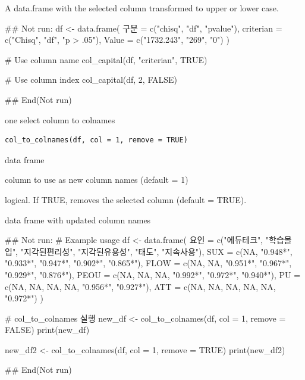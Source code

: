 \documentclass[a4paper]{book}
\begin{document}
%
\begin{Value}
A data.frame with the selected column transformed to upper or lower case.
\end{Value}
%
\begin{Examples}
\begin{ExampleCode}
\#\# Not run: 
df <- data.frame(
  구분 = c("chisq", "df", "pvalue"),
  criterian = c("Chisq", "df", "p > .05"),
  Value = c("1732.243", "269", "0")
)

# Use column name
col_capital(df, "criterian", TRUE)

# Use column index
col_capital(df, 2, FALSE)

## End(Not run)
\end{ExampleCode}
\end{Examples}
%
\begin{Description}
one select column to colnames
\end{Description}
%
\begin{Usage}
\begin{verbatim}
col_to_colnames(df, col = 1, remove = TRUE)
\end{verbatim}
\end{Usage}
%
\begin{Arguments}
\begin{ldescription}
\item[\code{df}] data frame

\item[\code{col}] column to use as new column names (default = 1)

\item[\code{remove}] logical. If TRUE, removes the selected column (default = TRUE).
\end{ldescription}
\end{Arguments}
%
\begin{Value}
data frame with updated column names
\end{Value}
%
\begin{Examples}
\begin{ExampleCode}
\#\# Not run: 
# Example usage
df <- data.frame(
  요인 = c("에듀테크", "학습몰입", "지각된편리성", "지각된유용성", "태도", "지속사용"),
  SUX = c(NA, "0.948*", "0.933*", "0.947*", "0.902*", "0.865*"),
  FLOW = c(NA, NA, "0.951*", "0.967*", "0.929*", "0.876*"),
  PEOU = c(NA, NA, NA, "0.992*", "0.972*", "0.940*"),
  PU = c(NA, NA, NA, NA, "0.956*", "0.927*"),
  ATT = c(NA, NA, NA, NA, NA, "0.972*")
)

# col_to_colnames 실행
new_df <- col_to_colnames(df, col = 1, remove = FALSE)
print(new_df)

new_df2 <- col_to_colnames(df, col = 1, remove = TRUE)
print(new_df2)

## End(Not run)

\end{ExampleCode}
\end{Examples}
\end{document}
